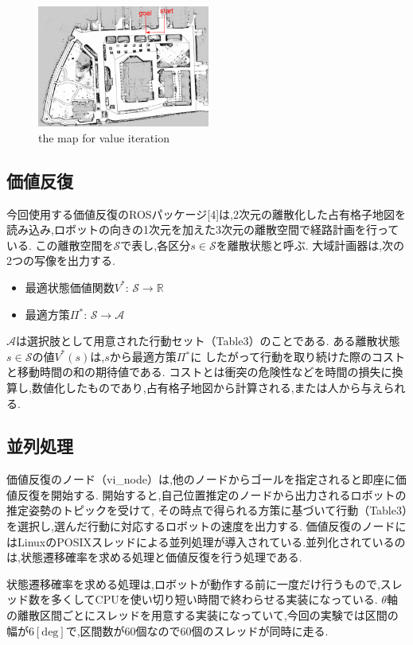 \documentclass{jarticle}
\begin{document}
\begin{figure}[h!]
  \centering
   \includegraphics[height=40mm]{./figs/tsudanuma.png}
   \caption{the map for value iteration}
\end{figure}

\subsection{価値反復}
今回使用する価値反復のROSパッケージ[4]は,2次元の離散化した占有格子地図を読み込み,ロボットの向きの1次元を加えた3次元の離散空間で経路計画を行っている.
この離散空間を$\mathcal{S}$で表し,各区分$\mathit{s}\in\mathcal{S}$を離散状態と呼ぶ.
大域計画器は,次の2つの写像を出力する.
\begin{itemize}
	\item 最適状態価値関数$\mathit{V^*}$: $\mathcal{S}\rightarrow\mathbb{R}$
	\item 最適方策$\Pi\mathrm{^*}$: $\mathcal{S}\rightarrow\mathcal{A}$
\end{itemize}
$\mathcal{A}$は選択肢として用意された行動セット（Table3）のことである.
ある離散状態$\mathit{s}\in\mathcal{S}$の値$\mathit{V^*}(\mathit{s})$は,$\mathit{s}$から最適方策$\Pi\mathrm{^*}$に
したがって行動を取り続けた際のコストと移動時間の和の期待値である.
コストとは衝突の危険性などを時間の損失に換算し,数値化したものであり,占有格子地図から計算される,または人から与えられる.

\subsection{並列処理}
価値反復のノード（vi\_node）は,他のノードからゴールを指定されると即座に価値反復を開始する.
開始すると,自己位置推定のノードから出力されるロボットの推定姿勢のトピックを受けて,
その時点で得られる方策に基づいて行動（Table3）を選択し,選んだ行動に対応するロボットの速度を出力する.
価値反復のノードにはLinuxのPOSIXスレッドによる並列処理が導入されている.並列化されているのは,状態遷移確率を求める処理と価値反復を行う処理である.

状態遷移確率を求める処理は,ロボットが動作する前に一度だけ行うもので,スレッド数を多くしてCPUを使い切り短い時間で終わらせる実装になっている.
$\theta$軸の離散区間ごとにスレッドを用意する実装になっていて,今回の実験では区間の幅が6$\mathrm{[deg]}$で,区間数が60個なので60個のスレッドが同時に走る.
\end{document}
